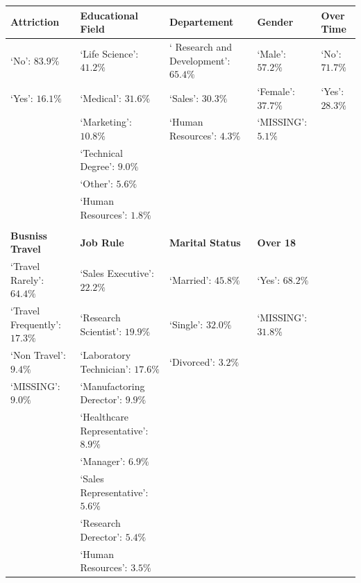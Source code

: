 \documentclass[a4paper,9pt]{article}
\begin{document}
\begin{center}\footnotesize
\begin{tabular}{lllll}
\toprule
\bfseries Attriction &\bfseries  Educational Field & \bfseries Departement &\bfseries  Gender & \bfseries Over Time\\
\hline
\hline
\rowcolor[gray]{0.9}
`No': $83.9\%$ &`Life Science': $41.2\%$ &` Research and Development': $65.4\%$ & `Male': $57.2\%$ & `No': $71.7\%$ \\
`Yes': $16.1\%$ &`Medical': $31.6\%$ &`Sales': $30.3\%$ & `Female': $37.7\%$ & `Yes': $28.3\%$ \\
\rowcolor[gray]{0.9}
                          &`Marketing': $10.8\%$ &`Human Resources': $4.3\%$ & `MISSING': $5.1\%$ &  \\
                          &`Technical Degree': $9.0\%$ &                                   &                                 &  \\
\rowcolor[gray]{0.9}
                          &`Other': $5.6\%$ &                                   &                                 &  \\
                          &`Human Resources': $1.8\%$ &                                   &                                 &  \\
&&&&\\
\hline
\bfseries Busniss Travel &\bfseries  Job Rule& \bfseries Marital Status &\bfseries  Over 18 & \\
\hline
\hline
\rowcolor[gray]{0.9}
`Travel Rarely': $64.4\%$ &`Sales Executive': $22.2\%$ &`Married': $45.8\%$ & `Yes': $68.2\%$ &\\
`Travel Frequently': $17.3\%$ &`Research Scientist': $19.9\%$ &`Single': $32.0\%$ & `MISSING': $31.8\%$ &\\
\rowcolor[gray]{0.9}
`Non Travel': $9.4\%$ &`Laboratory Technician': $17.6\%$ &`Divorced': $3.2\%$ &       &      \\
`MISSING': $9.0\%$ &`Manufactoring Derector': $9.9\%$ &     &       &      \\
\rowcolor[gray]{0.9}
                               &`Healthcare Representative': $8.9\%$ &     &       &      \\
                               &`Manager': $6.9\%$ &     &       &      \\
\rowcolor[gray]{0.9}
                               &`Sales Representative': $5.6\%$ &     &       &      \\
                               &`Research Derector': $5.4\%$ &     &       &      \\
\rowcolor[gray]{0.9}
                               &`Human Resources': $3.5\%$ &     &       &      \\
\bottomrule
\end{tabular}
\end{center}
\end{document}
